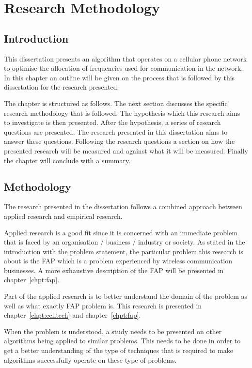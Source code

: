 \chapter{Research Methodology}
\section{Introduction}
This dissertation presents an algorithm that operates on a cellular phone network to optimise the allocation of frequencies used for communication in the network. In this chapter an outline will be given on the process that is followed by this dissertation for the research presented.

The chapter is structured as follows. The next section discusses the specific research methodology that is followed. The hypothesis which this research aims to investigate is then presented. After the hypothesis, a series of research questions are presented. The research presented in this dissertation aims to answer these questions.
Following the research questions a section on how the presented research will be measured and against what it will be measured. Finally the chapter will conclude with a summary.
\section{Methodology}
The research presented in the dissertation follows a combined approach between applied research and empirical research. 

Applied research is a good fit since it is concerned with an immediate problem that is faced by an organisation / business / industry or society. As stated in the introduction with the problem statement, the particular problem this research is about is the \gls{FAP} which is a problem experienced by wireless communication businesses. A more exhaustive description of the \gls{FAP} will be presented in chapter~\ref{chpt:fap}.

Part of the applied research is to better understand the domain of the problem as well as what exactly \gls{FAP} problem is. This research is presented in chapter~\ref{chpt:celltech} and chapter~\ref{chpt:fap}.

When the problem is understood, a study needs to be presented on other algorithms being applied to similar problems. This needs to be done in order to get a better understanding of the type of techniques that is required to make algorithms successfully operate on these type of problems.

